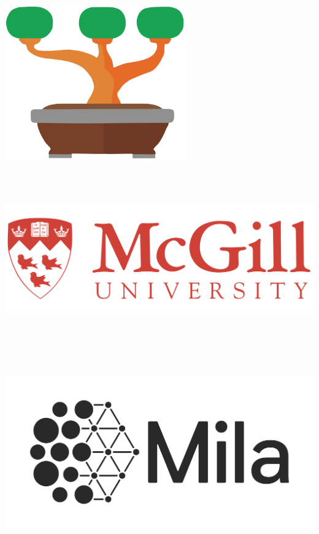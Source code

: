 \documentclass[portrait,a0b,final,a4resizeable]{a0poster}
\begin{document}
\begin{poster}
{    \hspace{1.8cm}
    \begin{minipage}[c][0.1\paperheight][c]{0.18\textwidth} \end{minipage}
    \begin{minipage}[c][0.1\paperheight][c]{0.25\textwidth}\includegraphics[height=2.6in]{../figures/tidyparse_logo.png} \end{minipage}
    \hspace{-4cm}
    \begin{minipage}[c][0.1\paperheight][c]{0.33\textwidth}\includegraphics[height=3in]{../figures/mcgill.png} \end{minipage}
    \hspace{2cm}
    \begin{minipage}[c][0.1\paperheight][c]{0.33\textwidth}\includegraphics[height=3.2in]{../figures/mila.png} \end{minipage}
}
\end{poster}
\end{document}
